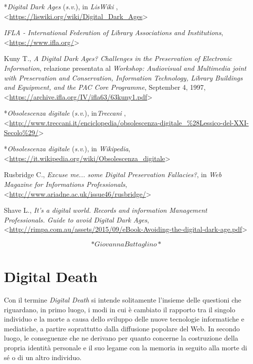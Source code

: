 \documentclass[
  b5paper,
  twoside,
  11pt,
  chapterprefix=false,
  bibliography=totocnumbered,
  parskip=0]{scrbook}
\begin{document}
*\emph{Digital Dark Ages} (\emph{s.v}.), in \emph{LisWiki} ,
\textless{}\href{https://liswiki.org/wiki/Digital_Dark_Ages}{{https://liswiki.org/wiki/Digital\_Dark\_Ages}}\textgreater{}

\emph{IFLA - International Federation of Library Associations and
Institutions},
\textless{}\href{https://www.ifla.org/}{{https://www.ifla.org/}}\textgreater{}

Kuny T., \emph{A Digital Dark Ages? Challenges in the Preservation of
Electronic Information}, relazione presentata al \emph{Workshop: Audiovisual
and Multimedia joint with Preservation and Conservation, Information
Technology, Library Buildings and Equipment, and the PAC Core
Programme}, September 4, 1997,
\textless{}\href{https://archive.ifla.org/IV/ifla63/63kuny1.pdf}{{https://archive.ifla.org/IV/ifla63/63kuny1.pdf}}\textgreater{}

*\emph{Obsolescenza digitale} (\emph{s.v}.), in\emph{Treccani} ,
\textless{}\href{http://www.treccani.it/enciclopedia/obsolescenza-digitale_(Lessico-del-XXI-Secolo)/}{{http://www.treccani.it/enciclopedia/obsolescenza-digitale\_\%28Lessico-del-XXI-Secolo\%29/}}\textgreater{}

*\emph{Obsolescenza digitale} (\emph{s.v}.), in \emph{Wikipedia},
\textless{}\href{https://it.wikipedia.org/wiki/Obsolescenza_digitale}{{https://it.wikipedia.org/wiki/Obsolescenza\_digitale}}\textgreater{}

Rusbridge C., \emph{Excuse me... some Digital Preservation Fallacies?}, in
\emph{Web Magazine for Informations Professionals},
\textless{}\href{http://www.ariadne.ac.uk/issue46/rusbridge/}{{http://www.ariadne.ac.uk/issue46/rusbridge/}}\textgreater{}

Shave L., \emph{It's a digital world. Records and information Management
Professionals. Guide to avoid Digital Dark Ages},
\textless{}\href{http://rimpa.com.au/assets/2015/09/eBook-Avoiding-the-digital-dark-age.pdf}{{http://rimpa.com.au/assets/2015/09/eBook-Avoiding-the-digital-dark-age.pdf}}\textgreater{}

\[*Giovanna Battaglino*\]

\hypertarget{digital-death}{%
\chapter{Digital Death}\label{digital-death}}

Con il termine \emph{Digital Death} si intende solitamente l'insieme delle
questioni che riguardano, in primo luogo, i modi in cui è cambiato il
rapporto tra il singolo individuo e la morte a causa dello sviluppo
delle nuove tecnologie informatiche e mediatiche, a partire soprattutto
dalla diffusione popolare del Web. In secondo luogo, le conseguenze che
ne derivano per quanto concerne la costruzione della propria identità
personale e il suo legame con la memoria in seguito alla morte di sé o
di un altro individuo.
\end{document}
